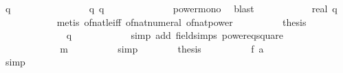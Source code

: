 \begin{isabellebody}
\ {\isachardoublequoteopen}q{\isacharcircum}{}\ {\isasymle}\ {}{}{}{}{\isacharcircum}{}{\isachardoublequoteclose}\isanewline
\ \ \ \ \ \ \ \ \ \ \isamarkupfalse%
\ {\isacharbackquoteopen}{}\ {\isasymle}\ q{\isacharbackquoteclose}\ {\isacharbackquoteopen}q\ {\isasymle}\ {}{}{}{}{\isacharbackquoteclose}\isanewline
\ \ \ \ \ \ \ \ \ \ \isamarkupfalse%
\ power{\isacharunderscore}mono\ \isamarkupfalse%
\ blast\isanewline
\ \ \ \ \ \ \ \ \isamarkupfalse%
\ \isamarkupfalse%
\ {\isachardoublequoteopen}{\isacharparenleft}real\ q{\isacharparenright}{\isacharcircum}{}\ {\isasymle}\ {}{}{}{}{\isacharcircum}{}{\isachardoublequoteclose}\isanewline
\ \ \ \ \ \ \ \ \ \ \isamarkupfalse%
\ {\isacharparenleft}metis\ of{\isacharunderscore}nat{\isacharunderscore}le{\isacharunderscore}iff\ of{\isacharunderscore}nat{\isacharunderscore}numeral\ of{\isacharunderscore}nat{\isacharunderscore}power{\isacharparenright}\isanewline
\ \ \ \ \ \ \ \ \isamarkupfalse%
\ {\isacharquery}thesis\isanewline
\ \ \ \ \ \ \ \ \ \ \isamarkupfalse%
\ {\isacharbackquoteopen}{}\ {\isasymle}\ q{\isacharbackquoteclose}\isanewline
\ \ \ \ \ \ \ \ \ \ \isamarkupfalse%
\ {\isacharparenleft}simp\ add{\isacharcolon}\ field{\isacharunderscore}simps\ power{}{\isacharunderscore}eq{\isacharunderscore}square{\isacharparenright}\isanewline
\ \ \ \ \ \ \isamarkupfalse%
\isanewline
\ \ \ \ \ \ \isamarkupfalse%
\ \isamarkupfalse%
\ {\isachardoublequoteopen}{\isasymDelta}\ {}{}{}{}\ {\isasymle}\ {\isacharquery}m{\isachardoublequoteclose}\isanewline
\ \ \ \ \ \ \ \ \isamarkupfalse%
\ simp\isanewline
\isanewline
\ \ \ \ \ \ \isamarkupfalse%
\ {\isacharquery}thesis\isanewline
\ \ \ \ \ \ \ \ \isamarkupfalse%
\ {\isacharbackquoteopen}{\isacharquery}f\ a\ {\isasymle}\ {\isacharquery}{\isasymDelta}\ {}{}{}{}{\isacharbackquoteclose}\ {\isacharbackquoteopen}{\isasymDelta}\ {\isacharequal}\ {\isacharquery}{\isasymDelta}{\isacharbackquoteclose}\isanewline
\ \ \ \ \ \ \ \ \isamarkupfalse%
\ simp\isanewline
\ \ \ \ \isamarkupfalse%
\isanewline
\ \ \isamarkupfalse%
\isanewline
{}\isamarkupfalse%
%
\endisatagproof
{\isafoldproof}%
%
\isadelimproof
\isanewline
%
\endisadelimproof
%
\isadelimtheory
\isanewline
%
\endisadelimtheory
%
\isatagtheory
{}\isamarkupfalse%
%
\endisatagtheory
{\isafoldtheory}%
%
\isadelimtheory
%
\endisadelimtheory
%
\end{isabellebody}%
